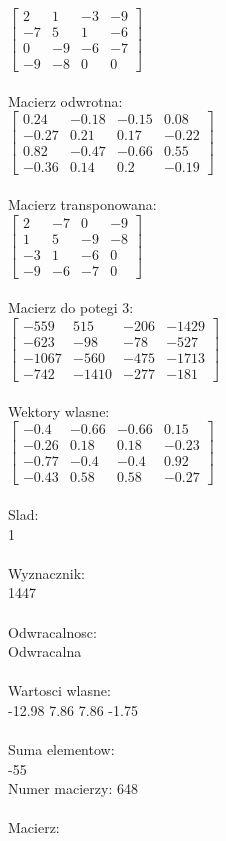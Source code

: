 \documentclass[a4paper,12pt]{article}
\begin{document}
$\begin{bmatrix} 2&1&-3&-9\\-7&5&1&-6\\0&-9&-6&-7\\-9&-8&0&0 \end{bmatrix}$
\\
\\
Macierz odwrotna:\\

$\begin{bmatrix} 0.24&-0.18&-0.15&0.08\\-0.27&0.21&0.17&-0.22\\0.82&-0.47&-0.66&0.55\\-0.36&0.14&0.2&-0.19 \end{bmatrix}$
\\
\\
Macierz transponowana:\\

$\begin{bmatrix} 2&-7&0&-9\\1&5&-9&-8\\-3&1&-6&0\\-9&-6&-7&0 \end{bmatrix}$
\\
\\
Macierz do potegi 3:\\

$\begin{bmatrix} -559&515&-206&-1429\\-623&-98&-78&-527\\-1067&-560&-475&-1713\\-742&-1410&-277&-181 \end{bmatrix}$
\\
\\
Wektory wlasne:\\

$\begin{bmatrix} -0.4&-0.66&-0.66&0.15\\-0.26&0.18&0.18&-0.23\\-0.77&-0.4&-0.4&0.92\\-0.43&0.58&0.58&-0.27 \end{bmatrix}$
\\
\\
Slad:\\
1
\\
\\
Wyznacznik:\\
1447
\\
\\
Odwracalnosc:\\
Odwracalna
\\
\\
Wartosci wlasne:\\
-12.98 7.86 7.86 -1.75
\\
\\
Suma elementow:\\
-55
\\
\newpage
Numer macierzy:
648
\\
\\
Macierz:\\
\end{document}
